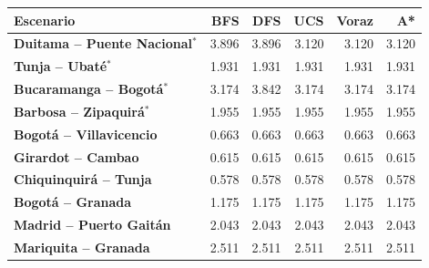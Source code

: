 \renewcommand{\arraystretch}{1.2}
\begin{tabular}{|l|r|r|r|r|r|}
\hline
\rowcolor{gray!20} \textbf{Escenario} & \textbf{BFS} & \textbf{DFS} & \textbf{UCS} & \textbf{Voraz} & \textbf{A*} \\
\hline
\textbf{Duitama -- Puente Nacional$^{*}$} & 3.896 & 3.896 & 3.120 & 3.120 & 3.120 \\
\hline
\textbf{Tunja -- Ubaté$^{*}$} & 1.931 & 1.931 & 1.931 & 1.931 & 1.931 \\
\hline
\textbf{Bucaramanga -- Bogotá$^{*}$} & 3.174 & 3.842 & 3.174 & 3.174 & 3.174 \\
\hline
\textbf{Barbosa -- Zipaquirá$^{*}$} & 1.955 & 1.955 & 1.955 & 1.955 & 1.955 \\
\hline
\textbf{Bogotá -- Villavicencio} & 0.663 & 0.663 & 0.663 & 0.663 & 0.663 \\
\hline
\textbf{Girardot -- Cambao} & 0.615 & 0.615 & 0.615 & 0.615 & 0.615 \\
\hline
\textbf{Chiquinquirá -- Tunja} & 0.578 & 0.578 & 0.578 & 0.578 & 0.578 \\
\hline
\textbf{Bogotá -- Granada} & 1.175 & 1.175 & 1.175 & 1.175 & 1.175 \\
\hline
\textbf{Madrid -- Puerto Gaitán} & 2.043 & 2.043 & 2.043 & 2.043 & 2.043 \\
\hline
\textbf{Mariquita -- Granada} & 2.511 & 2.511 & 2.511 & 2.511 & 2.511 \\
\hline
\end{tabular}
